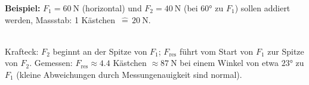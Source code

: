 \documentclass[addpoints,11pt,a4paper]{exam}
\begin{document}
\begin{theoriebox}
\textbf{Beispiel:} $F_1=\SI{60}{\newton}$ (horizontal) und
$F_2=\SI{40}{\newton}$ (bei $\ang{60}$ zu $F_1$) sollen addiert werden,
Massstab: 1 Kästchen $\,\widehat{=}\,\SI{20}{\newton}$.

\begin{center}
\\[0.2em]
{\scriptsize Krafteck: $F_2$ beginnt an der Spitze von $F_1$; $F_{\text{res}}$
führt vom Start von $F_1$ zur Spitze von $F_2$. Gemessen: $F_{\text{res}}
\approx 4.4$ Kästchen $\approx\SI{87}{\newton}$ bei einem Winkel von
etwa $\ang{23}$ zu $F_1$ (kleine Abweichungen durch Messungenauigkeit
sind normal).}
\end{center}
\end{theoriebox}
\end{document}
